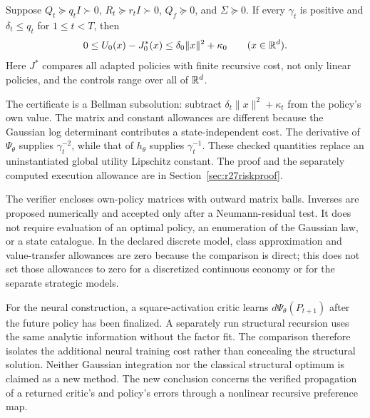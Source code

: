 \begin{theorem}\label{thm:r27entropic}
Suppose $Q_t\succeq q_tI\succ0$, $R_t\succeq r_tI\succ0$, $Q_f\succeq0$,
and $\Sigma\succeq0$. If every $\gamma_t$ is positive and
$\delta_t\leq q_t$ for $1\leq t<T$, then
\begin{equation}\label{eq:r27riskgap}
 0\leq U_0(x)-J_0^*(x)\leq\delta_0\|x\|^2+\kappa_0
 \qquad(x\in\mathbb R^d).
\end{equation}
Here $J^*$ compares all adapted policies with finite recursive cost, not only
linear policies, and the controls range over all of $\mathbb R^d$.
\end{theorem}

The certificate is a Bellman subsolution: subtract
$\delta_t\|x\|^2+\kappa_t$ from the policy's own value. The matrix and constant
allowances are different because the Gaussian log determinant contributes a
state-independent cost. The derivative of $\Psi_\theta$ supplies
$\gamma_t^{-2}$, while that of $h_\theta$ supplies $\gamma_t^{-1}$.
These checked quantities replace an uninstantiated global utility Lipschitz
constant. The proof and the separately computed execution allowance are in
Section~\ref{sec:r27riskproof}.

The verifier encloses own-policy matrices with outward matrix balls. Inverses
are proposed numerically and accepted only after a Neumann-residual test.
It does not require evaluation of an optimal policy, an enumeration of the
Gaussian law, or a state catalogue. In the declared discrete model, class
approximation and value-transfer allowances are zero because the comparison
is direct; this does not set those allowances to zero for a discretized
continuous economy or for the separate strategic models.

For the neural construction, a square-activation critic learns
$d\Psi_\theta(P_{t+1})$ after the future policy has been finalized. A separately
run structural recursion uses the same analytic information without the
factor fit. The comparison therefore isolates the additional neural training
cost rather than concealing the structural solution. Neither Gaussian
integration nor the classical structural optimum is claimed as a new method.
The new conclusion concerns the verified propagation of a returned critic's
and policy's errors through a nonlinear recursive preference map.
